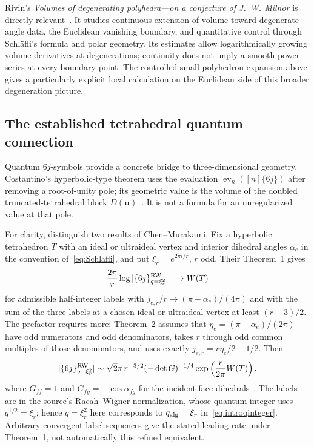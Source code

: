 Rivin's \emph{Volumes of degenerating polyhedra---on a conjecture
of J.~W. Milnor} is directly relevant~\cite{RivinDegeneration}.
It studies continuous extension of volume toward degenerate angle
data, the Euclidean vanishing boundary, and quantitative control
through Schl\"afli's formula and polar geometry. Its estimates
allow logarithmically growing volume derivatives at degenerations;
continuity does not imply a smooth power series at every boundary
point. The controlled small-polyhedron expansion above gives a
particularly explicit local calculation on the Euclidean side of
this broader degeneration picture.

\subsection{The established tetrahedral quantum connection}

Quantum $6j$-symbols provide a concrete bridge to three-dimensional
geometry. Costantino's hyperbolic-type theorem uses the evaluation
$\operatorname{ev}_n([n]\{6j\})$ after removing a root-of-unity pole;
its geometric value is the volume of the doubled truncated-tetrahedral
block $D(\boldsymbol u)$~\cite[Definitions~3.1--3.2 and Theorem~3.9]{Costantino}.
It is not a formula for an unregularized value at that pole.

For clarity, distinguish two results of Chen--Murakami. Fix a
hyperbolic tetrahedron $T$ with an ideal or ultraideal vertex and
interior dihedral angles $\alpha_e$ in the convention of~\eqref{eq:Schlafli},
and put $\xi_r=e^{2\pi i/r}$, $r$ odd. Their Theorem~1 gives
\[
 \frac{2\pi}{r}\log|\{6j\}^{\rm RW}_{q=\xi_r^2}|
       \longrightarrow W(T)
\]
for admissible half-integer labels with
$j_{e,r}/r\to(\pi-\alpha_e)/(4\pi)$ and with the sum of the
three labels at a chosen ideal or ultraideal vertex at least
$(r-3)/2$. The prefactor requires more: Theorem~2 assumes that
$\eta_e=(\pi-\alpha_e)/(2\pi)$ have odd numerators and odd
denominators, takes $r$ through odd common multiples of those
denominators, and uses exactly $j_{e,r}=r\eta_e/2-1/2$. Then
\begin{equation}
 |\{6j\}^{\rm RW}_{q=\xi_r^2}|\sim
 \sqrt2\pi\,r^{-3/2}(-\det G)^{-1/4}
                 \exp\left(\frac{r}{2\pi}W(T)\right),
 \label{eq:quantum6jstructure}
\end{equation}
where $G_{ff}=1$ and $G_{fg}=-\cos\alpha_{fg}$ for the incident
face dihedrals~\cite[Theorems~1--2, pp.~1--2]{ChenMurakami}.
The labels are in the source's Racah--Wigner normalization, whose
quantum integer uses $q^{1/2}=\xi_r$; hence $q=\xi_r^2$ here corresponds
to $q_{\rm alg}=\xi_r$ in~\eqref{eq:introqinteger}. Arbitrary
convergent label sequences give the stated leading rate under
Theorem~1, not automatically this refined equivalent.

